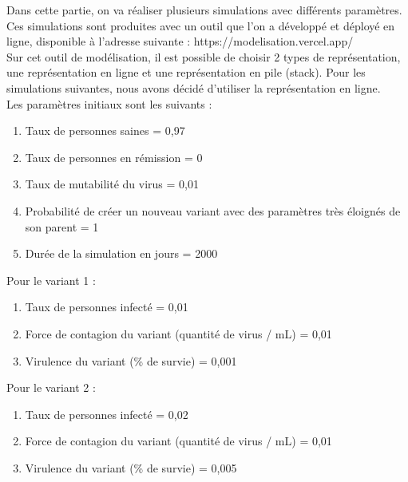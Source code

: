 \documentclass{article}
\begin{document}
Dans cette partie, on va réaliser plusieurs simulations avec différents paramètres. Ces simulations sont produites avec un outil que l'on a développé et déployé en ligne, disponible à l'adresse suivante : https://modelisation.vercel.app/ \\
Sur cet outil de modélisation, il est possible de choisir 2 types de représentation, une représentation en ligne et une représentation en pile (stack). Pour les simulations suivantes, nous avons décidé d'utiliser la représentation en ligne. \\
Les paramètres initiaux sont les suivants :
\begin{enumerate}
    \item Taux de personnes saines = 0,97
    \item Taux de personnes en rémission = 0
    \item Taux de mutabilité du virus = 0,01
    \item Probabilité de créer un nouveau variant avec des paramètres très éloignés de son parent = 1
    \item Durée de la simulation en jours = 2000 \\
\end{enumerate}
Pour le variant 1 :
\begin{enumerate}
    \item Taux de personnes infecté = 0,01
    \item Force de contagion du variant (quantité de virus / mL) = 0,01
    \item Virulence du variant (\% de survie) = 0,001\\
\end{enumerate}
Pour le variant 2 :
\begin{enumerate}
    \item Taux de personnes infecté = 0,02
    \item Force de contagion du variant (quantité de virus / mL) = 0,01
    \item Virulence du variant (\% de survie) = 0,005\\
\end{enumerate}
\end{document}

